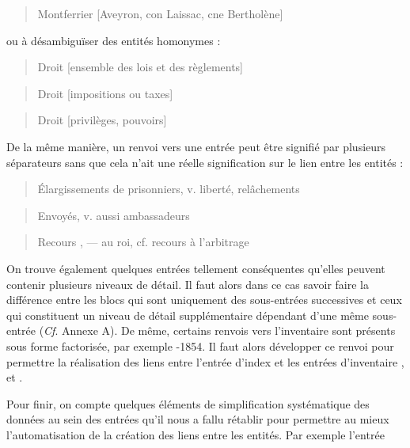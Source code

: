 \documentclass[a4paper,12pt,twoside]{book}
\begin{document}
	\begin{quotation}
		Montferrier [Aveyron, con Laissac, cne Bertholène]
	\end{quotation}

	\noindent ou à désambiguïser des entités homonymes :

	\begin{quotation}
		Droit [ensemble des lois et des règlements]
	\end{quotation}

	\begin{quotation}
		Droit [impositions ou taxes]
	\end{quotation}

	\begin{quotation}
		Droit [privilèges, pouvoirs]
	\end{quotation}
	
	De la même manière, un renvoi vers une entrée peut être signifié par plusieurs séparateurs sans que cela n'ait une réelle signification sur le lien entre les entités :
	
	\begin{quotation}
		Élargissements de prisonniers, v. liberté, relâchements
	\end{quotation}

	\begin{quotation}
		Envoyés, v. aussi ambassadeurs
	\end{quotation}

	\begin{quotation}
		Recours , — au roi, cf. recours à l'arbitrage
	\end{quotation}
	
	On trouve également quelques entrées tellement conséquentes qu'elles peuvent contenir plusieurs niveaux de détail. Il faut alors dans ce cas savoir faire la différence entre les blocs qui sont uniquement des sous-entrées successives et ceux qui constituent un niveau de détail supplémentaire dépendant d'une même sous-entrée (\textit{Cf}. Annexe A). De même, certains renvois vers l'inventaire sont présents sous forme factorisée, par exemple -1854\fg{}. Il faut alors développer ce renvoi pour permettre la réalisation des liens entre l'entrée d'index et les entrées d'inventaire \fg{}, \fg{} et \fg{}.
	
	Pour finir, on compte quelques éléments de simplification systématique des données au sein des entrées qu'il nous a fallu rétablir pour permettre au mieux l'automatisation de la création des liens entre les entités. Par exemple l'entrée
	
\end{document}
